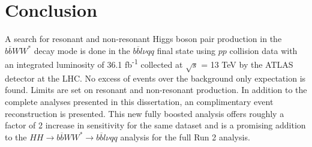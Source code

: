 \chapter{Conclusion}
\label{chap:conc}
A search for resonant and non-resonant Higgs boson pair production in the ${b\overline{b}WW^{*}}$ decay mode is done in the ${b\overline{b}l\nu qq}$ final state using $pp$ collision data with an integrated luminosity of 36.1 fb\textsuperscript{-1} collected at ${\sqrt{s}}$ = 13 TeV by the ATLAS detector at the LHC. No excess of events over the background only expectation is found. Limits are set on resonant and non-resonant production. \newline
\indent In addition to the complete analyses presented in this dissertation, an complimentary event reconstruction is presented. This new fully boosted analysis offers roughly a factor of 2 increase in sensitivity for the same dataset and is a promising addition to the ${HH\rightarrow b\overline{b}WW^{*}\rightarrow b\overline{b}l\nu qq}$ analysis for the full Run 2 analysis. 